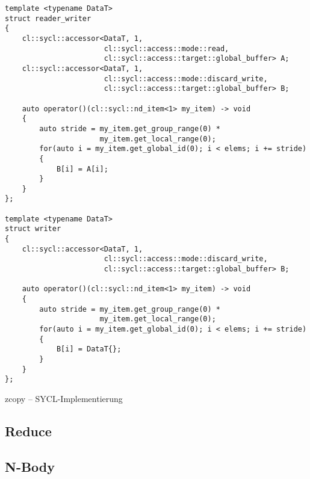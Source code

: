 \begin{code}
    \begin{verbatim}
template <typename DataT>
struct reader_writer
{
    cl::sycl::accessor<DataT, 1,
                       cl::sycl::access::mode::read,
                       cl::sycl::access::target::global_buffer> A;
    cl::sycl::accessor<DataT, 1,
                       cl::sycl::access::mode::discard_write,
                       cl::sycl::access::target::global_buffer> B;

    auto operator()(cl::sycl::nd_item<1> my_item) -> void
    {
        auto stride = my_item.get_group_range(0) *
                      my_item.get_local_range(0);
        for(auto i = my_item.get_global_id(0); i < elems; i += stride)
        {
            B[i] = A[i];
        }
    }
};

template <typename DataT>
struct writer
{
    cl::sycl::accessor<DataT, 1,
                       cl::sycl::access::mode::discard_write,
                       cl::sycl::access::target::global_buffer> B;

    auto operator()(cl::sycl::nd_item<1> my_item) -> void
    {
        auto stride = my_item.get_group_range(0) *
                      my_item.get_local_range(0);
        for(auto i = my_item.get_global_id(0); i < elems; i += stride)
        {
            B[i] = DataT{};
        }
    }
};
    \end{verbatim}
    \caption{zcopy -- SYCL-Implementierung}
    \label{anhang:sycl:zcopy}
\end{code}

\subsection{Reduce}
\subsection{N-Body}
